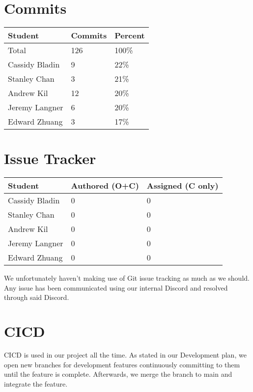 \documentclass{article}
\begin{document}
\section{Commits}


\begin{table}[H]
\centering
\begin{tabular}{lll}
\toprule
\textbf{Student} & \textbf{Commits} & \textbf{Percent}\\
\midrule
Total & 126 & 100\% \\
Cassidy Bladin & 9 & 22\% \\
Stanley Chan & 3 & 21\% \\
Andrew Kil & 12 & 20\% \\
Jeremy Langner & 6 & 20\% \\
Edward Zhuang & 3 & 17\% \\
\bottomrule
\end{tabular}
\end{table}

\section{Issue Tracker}


\begin{table}[H]
\centering
\begin{tabular}{lll}
\toprule
\textbf{Student} & \textbf{Authored (O+C)} & \textbf{Assigned (C only)}\\
\midrule
Cassidy Bladin & 0 & 0 \\
Stanley Chan & 0 & 0 \\
Andrew Kil & 0 & 0 \\
Jeremy Langner & 0 & 0 \\
Edward Zhuang & 0 & 0 \\
\bottomrule
\end{tabular}
\end{table}

We unfortunately haven't making use of Git issue tracking as much as we should. Any issue has been communicated using our internal Discord and resolved through said Discord.

\section{CICD}

CICD is used in our project all the time. As stated in our Development plan, we open new branches for development features continuously committing to them until the feature is complete. Afterwards, we merge the branch to main and integrate the feature. 
\end{document}
